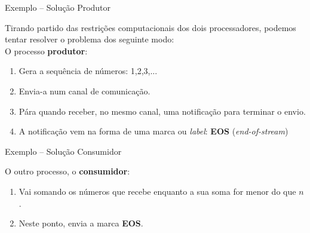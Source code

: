 \begin{frame}{Exemplo -- Solução \hfill \color{mLightBrown}Produtor}

  Tirando partido das restrições computacionais dos dois processadores, podemos tentar resolver o problema dos seguinte modo:\\
  \pause
  \vspace*{3mm}
 O processo \textbf{produtor}:
  \begin{enumerate}
  \item Gera a sequência de números: 1,2,3,...
    \pause
  \item Envia-a num canal de comunicação.
    \pause
  \item Pára quando receber, no mesmo canal, uma notificação para terminar o envio.
    \pause
  \item A notificação vem na forma de uma marca ou \textit{label}: \textbf{EOS} (\textit{end-of-stream})
  \end{enumerate}

\end{frame}


\begin{frame}{Exemplo -- Solução \hfill \color{mLightBrown}Consumidor}

  O outro processo, o \textbf{consumidor}:
  \vspace{2mm}
  \begin{enumerate}
  \item Vai somando os números que recebe enquanto a sua soma for menor do que $n$.
    \pause
    \vspace{5mm}
  \item Neste ponto, envia a marca \textbf{EOS}.
  \end{enumerate}
\end{frame}

